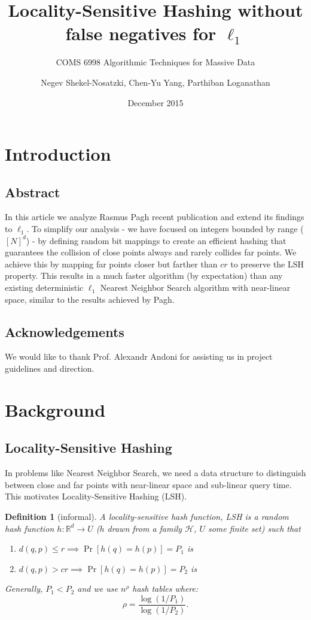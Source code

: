 \documentclass{scrartcl}
\title{Locality-Sensitive Hashing without false negatives for $\ell_1$}
\subtitle{COMS 6998 Algorithmic Techniques for Massive Data}
\author{Negev Shekel-Nosatzki, Chen-Yu Yang, Parthiban Loganathan}
\date{December 2015}
\newtheorem{definition}[theorem]{Definition}
\begin{document}
\maketitle

\tableofcontents

\pagebreak

\section{Introduction}

\subsection{Abstract}
In this article we analyze Rasmus Pagh recent publication  and extend its findings to $\ell_1$. To simplify our analysis - we have focused on integers bounded by range ($[N]^d$) - by defining random bit mappings to create an efficient hashing that guarantees the collision of close points always and rarely collides far points. We achieve this by mapping far points closer but farther than $cr$ to preserve the LSH property. This results in a much faster algorithm (by expectation) than any existing deterministic $\ell_1$ Nearest Neighbor Search algorithm with near-linear space, similar to the results achieved by Pagh.

\subsection{Acknowledgements}
We would like to thank Prof. Alexandr Andoni for assisting us in project guidelines and direction.
\section{Background}

\subsection{Locality-Sensitive Hashing}
In problems like Nearest Neighbor Search, we need a data structure to distinguish between close and far points with near-linear space and sub-linear query time. This motivates Locality-Sensitive Hashing (LSH).

\begin{definition}[informal]
  A \emph{locality-sensitive hash function, LSH} is a random hash function
  $h:\mathbb{R}^d \to U$
  ($h$ drawn from a family $\mathcal{H}$, $U$ some finite set) such that
  \begin{enumerate}
    \item $d(q,p) \leq r \implies \Pr[h(q)=h(p)] = P_1$ is 
    \item $d(q,p) > cr \implies \Pr[h(q)=h(p)] = P_2$ is 
  \end{enumerate}
  Generally, $P_1<P_2$ and we use $n^\rho$ hash tables where:
  \[ \rho = \frac{\log(1/P_1)}{\log(1/P_2)}.\]
\end{definition}
\end{document}
